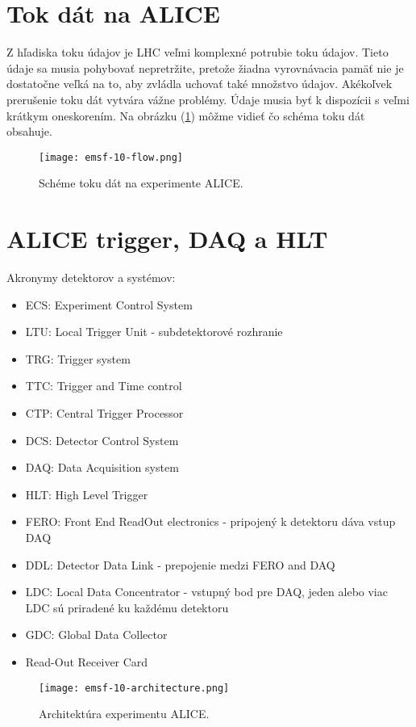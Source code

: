 \documentclass[../../main.tex]{subfiles}
\begin{document}
\section{Tok dát na ALICE}
Z hľadiska toku údajov je LHC veľmi komplexné potrubie toku údajov. Tieto údaje sa musia pohybovať nepretržite, pretože žiadna vyrovnávacia pamäť nie je dostatočne veľká na to, aby zvládla uchovať také množstvo údajov. Akékoľvek prerušenie toku dát vytvára vážne problémy. Údaje musia byť k dispozícii s veľmi krátkym oneskorením. Na obrázku (\ref{em10:fig:flow}) môžme vidieť čo schéma toku dát obsahuje.

\begin{figure}[!h]
\texttt{[image: emsf-10-flow.png]}
\centering
\caption{Schéme toku dát na experimente ALICE.}
\label{em10:fig:flow}
\end{figure}

\section{ALICE trigger, DAQ a HLT}
Akronymy detektorov a systémov: 
\begin{itemize}
\item ECS: Experiment Control System
\item LTU: Local Trigger Unit - subdetektorové rozhranie
\item TRG: Trigger system
\item TTC: Trigger and Time control
\item CTP: Central Trigger Processor
\item DCS: Detector Control System
\item DAQ: Data Acquisition system
\item HLT: High Level Trigger
\item FERO: Front End ReadOut electronics - pripojený k detektoru dáva vstup DAQ
\item DDL: Detector Data Link - prepojenie medzi FERO and DAQ
\item LDC: Local Data Concentrator - vstupný bod pre DAQ, jeden alebo viac LDC sú priradené ku každému detektoru
\item GDC: Global Data Collector
\item Read-Out Receiver Card
\end{itemize}

\begin{figure}[h!]
\texttt{[image: emsf-10-architecture.png]}
\centering
\caption{Architektúra experimentu ALICE.}
\label{em10:fig:architecture}
\end{figure}
\end{document}
